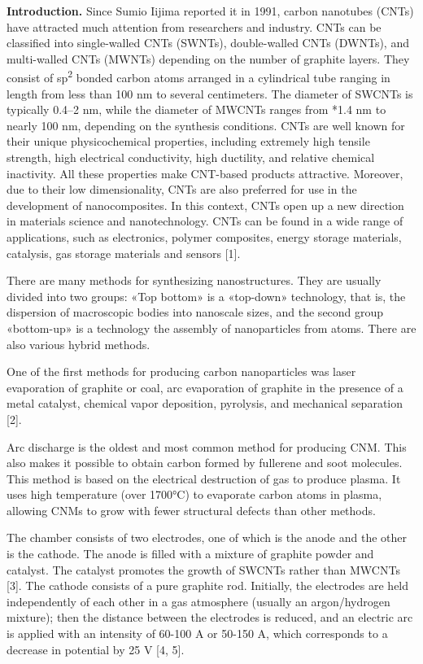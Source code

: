 {\bfseries Introduction.} Since Sumio Iijima reported it in 1991, carbon
nanotubes (CNTs) have attracted much attention from researchers and
industry. CNTs can be classified into single-walled CNTs (SWNTs),
double-walled CNTs (DWNTs), and multi-walled CNTs (MWNTs) depending on
the number of graphite layers. They consist of sp\textsuperscript{2}
bonded carbon atoms arranged in a cylindrical tube ranging in length
from less than 100 nm to several centimeters. The diameter of SWCNTs is
typically 0.4--2 nm, while the diameter of MWCNTs ranges from *1.4 nm to
nearly 100 nm, depending on the synthesis conditions. CNTs are well
known for their unique physicochemical properties, including extremely
high tensile strength, high electrical conductivity, high ductility, and
relative chemical inactivity. All these properties make CNT-based
products attractive. Moreover, due to their low dimensionality, CNTs are
also preferred for use in the development of nanocomposites. In this
context, CNTs open up a new direction in materials science and
nanotechnology. CNTs can be found in a wide range of applications, such
as electronics, polymer composites, energy storage materials, catalysis,
gas storage materials and sensors {[}1{]}.

There are many methods for synthesizing nanostructures. They are usually
divided into two groups: «Top bottom» is a «top-down» technology, that
is, the dispersion of macroscopic bodies into nanoscale sizes, and the
second group «bottom-up» is a technology the assembly of nanoparticles
from atoms. There are also various hybrid methods.

One of the first methods for producing carbon nanoparticles was laser
evaporation of graphite or coal, arc evaporation of graphite in the
presence of a metal catalyst, chemical vapor deposition, pyrolysis, and
mechanical separation {[}2{]}.

Arc discharge is the oldest and most common method for producing CNM.
This also makes it possible to obtain carbon formed by fullerene and
soot molecules. This method is based on the electrical destruction of
gas to produce plasma. It uses high temperature (over 1700°C) to
evaporate carbon atoms in plasma, allowing CNMs to grow with fewer
structural defects than other methods.

The chamber consists of two electrodes, one of which is the anode and
the other is the cathode. The anode is filled with a mixture of graphite
powder and catalyst. The catalyst promotes the growth of SWCNTs rather
than MWCNTs {[}3{]}. The cathode consists of a pure graphite rod.
Initially, the electrodes are held independently of each other in a gas
atmosphere (usually an argon/hydrogen mixture); then the distance
between the electrodes is reduced, and an electric arc is applied with
an intensity of 60-100 A or 50-150 A, which corresponds to a decrease in
potential by 25 V {[}4, 5{]}.

